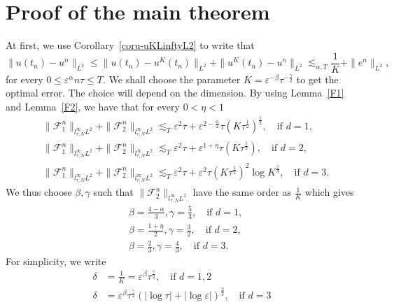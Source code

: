 \documentclass[10pt,a4paper]{article}
\begin{document}
  \section{Proof of the main theorem}
  At first, we use Corollary~\ref{coru-uKLinftyL2} to write that 
  \[ \| u(t_n) - u^n \|_{L^2} \leq \|u(t_n) - u^K(t_n)\|_{L^2} + \|u^K(t_n) - u^n\|_{L^2}
  \lesssim_{\alpha,T} \frac1K + \|e^n\|_{L^2}, \]
  for every \( 0 \leq \varepsilon^\alpha n\tau \leq T.\)
  We shall choose the parameter \(K = \varepsilon^{-\beta} \tau^{-\frac\gamma2}\)
  to get the optimal error. The choice will depend on the dimension. 
  By using Lemma~\ref{F1} and Lemma~\ref{F2}, we
  have that for every \(0<\eta<1\)
  \begin{equation*}
    \begin{aligned}
      & \|\mathcal F_1^n\|_{l^\infty_{\tau,N}L^2} + 
      \|\mathcal F_2^n\|_{l^\infty_{\tau,N}L^2} \lesssim_{T} \varepsilon^2 \tau +
      \varepsilon^{2-\frac\alpha2}\tau (K\tau^\frac12)^\frac12,\quad \text{if } d=1, \\
      & \|\mathcal F_1^n\|_{l^\infty_{\tau,N}L^2} + 
      \|\mathcal F_2^n\|_{l^\infty_{\tau,N}L^2} \lesssim_{T} \varepsilon^2 \tau +
      \varepsilon^{1+\eta} \tau (K\tau^\frac12),\quad \text{if } d=2, \\
      & \|\mathcal F_1^n\|_{l^\infty_{\tau,N}L^2} + 
      \|\mathcal F_2^n\|_{l^\infty_{\tau,N}L^2} \lesssim_{T} \varepsilon^2 \tau +
      \varepsilon^2 \tau (K\tau^\frac12)^2 \log{K}^\frac23,\quad \text{if } d=3.
    \end{aligned}
  \end{equation*}
  We thus choose \(\beta,\gamma\) such that \(\|\mathcal F_2^n\|_{l^\infty_{\tau,N}L^2}\) 
  have the same order as \(\frac1K\) which gives
  \begin{equation}\label{bg}
    \begin{aligned}
      & \beta = \frac{4-\alpha}3, \gamma = \frac53 ,\quad \text{if } d=1, \\ 
      & \beta = \frac{1+\eta}2, \gamma = \frac32, \quad \text{if } d=2, \\ 
      & \beta = \frac23, \gamma = \frac43, \quad \text{if } d=3. 
    \end{aligned}
  \end{equation}
  For simplicity, we write 
  \begin{equation}\label{delta}
    \begin{aligned}
      \delta &= \frac1K = \varepsilon^\beta \tau^{\frac\gamma2}, \quad \text{if } d=1,2\\ 
      \delta &= \varepsilon^\beta \tau^{\frac\gamma2}(|\log\tau|+|\log\varepsilon|)^\frac23,
      \quad \text{if } d=3 
    \end{aligned}
  \end{equation}
\end{document}
